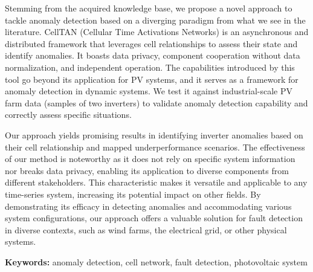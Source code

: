 Stemming from the acquired knowledge base, we propose a novel approach to tackle anomaly detection based on a diverging paradigm from what we see in the literature. CellTAN (Cellular Time Activations Networks) is an asynchronous and distributed framework that leverages cell relationships to assess their state and identify anomalies. It boasts data privacy, component cooperation without data normalization, and independent operation. The capabilities introduced by this tool go beyond its application for PV systems, and it serves as a framework for anomaly detection in dynamic systems. We test it against industrial-scale PV farm data (samples of two inverters) to validate anomaly detection capability and correctly assess specific situations.

Our approach yields promising results in identifying inverter anomalies based on their cell relationship and mapped underperformance scenarios. The effectiveness of our method is noteworthy as it does not rely on specific system information nor breaks data privacy, enabling its application to diverse components from different stakeholders. This characteristic makes it versatile and applicable to any time-series system, increasing its potential impact on other fields. By demonstrating its efficacy in detecting anomalies and accommodating various system configurations, our approach offers a valuable solution for fault detection in diverse contexts, such as wind farms, the electrical grid, or other physical systems.


\bigskip

\textbf{Keywords:} anomaly detection, cell network, fault detection, photovoltaic system
